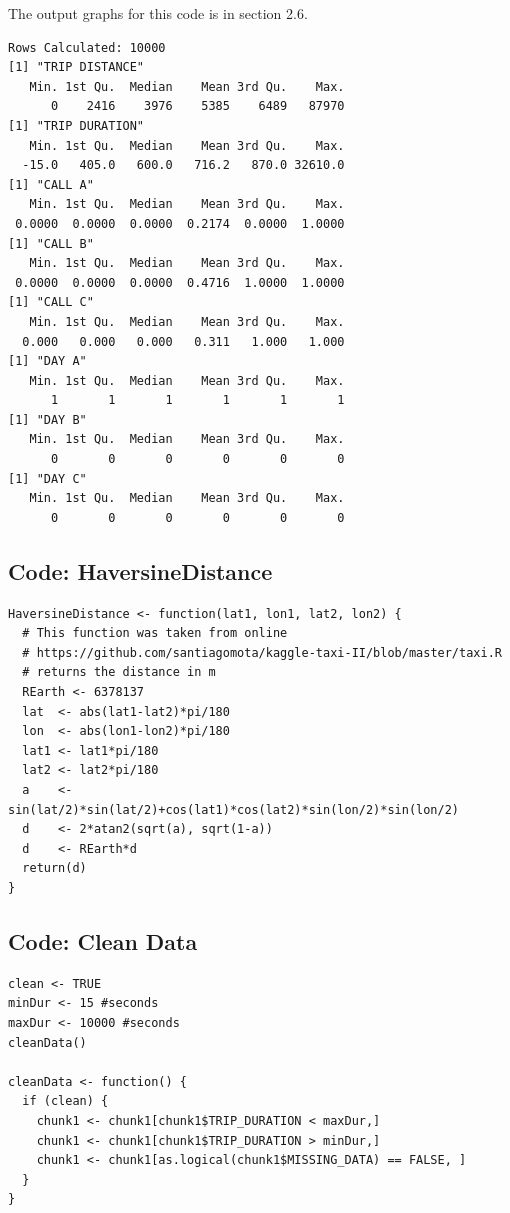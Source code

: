 \documentclass{article}
\numberwithin{equation}{section}
\begin{document}
The output graphs for this code is in section 2.6.
\begin{verbatim}
Rows Calculated: 10000 
[1] "TRIP DISTANCE"
   Min. 1st Qu.  Median    Mean 3rd Qu.    Max. 
      0    2416    3976    5385    6489   87970 
[1] "TRIP DURATION"
   Min. 1st Qu.  Median    Mean 3rd Qu.    Max. 
  -15.0   405.0   600.0   716.2   870.0 32610.0 
[1] "CALL A"
   Min. 1st Qu.  Median    Mean 3rd Qu.    Max. 
 0.0000  0.0000  0.0000  0.2174  0.0000  1.0000 
[1] "CALL B"
   Min. 1st Qu.  Median    Mean 3rd Qu.    Max. 
 0.0000  0.0000  0.0000  0.4716  1.0000  1.0000 
[1] "CALL C"
   Min. 1st Qu.  Median    Mean 3rd Qu.    Max. 
  0.000   0.000   0.000   0.311   1.000   1.000 
[1] "DAY A"
   Min. 1st Qu.  Median    Mean 3rd Qu.    Max. 
      1       1       1       1       1       1 
[1] "DAY B"
   Min. 1st Qu.  Median    Mean 3rd Qu.    Max. 
      0       0       0       0       0       0 
[1] "DAY C"
   Min. 1st Qu.  Median    Mean 3rd Qu.    Max. 
      0       0       0       0       0       0
\end{verbatim}

\subsection{Code: HaversineDistance}
\begin{lstlisting}
HaversineDistance <- function(lat1, lon1, lat2, lon2) {
  # This function was taken from online
  # https://github.com/santiagomota/kaggle-taxi-II/blob/master/taxi.R
  # returns the distance in m
  REarth <- 6378137
  lat  <- abs(lat1-lat2)*pi/180
  lon  <- abs(lon1-lon2)*pi/180
  lat1 <- lat1*pi/180
  lat2 <- lat2*pi/180
  a    <- sin(lat/2)*sin(lat/2)+cos(lat1)*cos(lat2)*sin(lon/2)*sin(lon/2)
  d    <- 2*atan2(sqrt(a), sqrt(1-a))
  d    <- REarth*d
  return(d)
}
\end{lstlisting}

\subsection{Code: Clean Data}
\begin{lstlisting}
clean <- TRUE
minDur <- 15 #seconds
maxDur <- 10000 #seconds
cleanData()

cleanData <- function() {
  if (clean) {
    chunk1 <- chunk1[chunk1$TRIP_DURATION < maxDur,]
    chunk1 <- chunk1[chunk1$TRIP_DURATION > minDur,]
    chunk1 <- chunk1[as.logical(chunk1$MISSING_DATA) == FALSE, ]
  }
}
\end{lstlisting}
\end{document}
